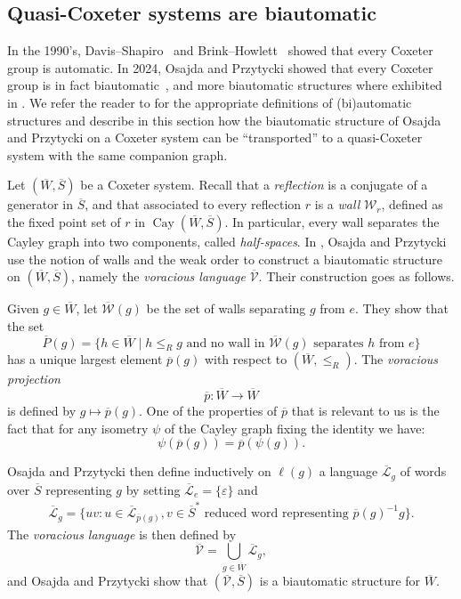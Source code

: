 \documentclass[A4paper, oneside]{amsart}
\newcommand{\id}{\textit{e}}
\newcommand{\Cay}{\operatorname{Cay}}
\newcommand{\W}{\mathcal{W}}
\newcommand{\V}{\mathcal{V}}
\theoremstyle{definition}
\begin{document}
\subsection{Quasi-Coxeter systems are biautomatic} \label{ss:Automatic} In the 1990's,  Davis--Shapiro~\cite{DS-au} and Brink--Howlett~\cite{BH-par} showed that every Coxeter group is automatic. In 2024, Osajda and Przytycki showed that every Coxeter group is in fact biautomatic~\cite{OP22}, and more biautomatic structures where exhibited in \cite{Sa25}. We refer the reader to \cite{Sa25} for the appropriate definitions of (bi)automatic structures and describe in this section how the biautomatic structure of Osajda and Przytycki on a Coxeter system can be ``transported'' to a quasi-Coxeter system with the same companion graph.
 
 \smallskip
 Let $(\overline{W}, \overline{S})$ be a Coxeter system. Recall that a \emph{reflection} is a conjugate of a generator in $\overline{S}$, and that associated to every reflection $r$ is a \emph{wall} $\W_r$, defined as the fixed point set of $r$ in $\Cay(\overline{W}, \overline{S})$. In particular, every wall separates the Cayley graph into two components, called \emph{half-spaces}. In \cite{OP22}, Osajda and Przytycki use the notion of walls and the weak order to construct a biautomatic structure on $(\overline{W}, \overline{S})$, namely the \emph{voracious language} $\overline{\V}$. Their construction goes as follows.
 
 Given $g \in \overline{W}$, let $\overline{\W}(g)$ be the set of walls separating $g$ from $\id$. They show that the set
 \[\overline{P}(g) = \{h \in \overline{W} \mid h \leq_R g \text{ and no wall in } \overline{\W}(g) \text{ separates } h \text{ from } \id\}\]
 has a unique largest element $\overline{p}(g)$ with respect to $(\overline{W},\leq_R)$. The \emph{voracious projection} 
 $$
 \overline{p}:\overline{W}\to \overline{W}
 $$
 is defined by  $g\mapsto \overline{p}(g)$. One of the properties of $\overline{p}$ that is relevant to us is the fact that for any isometry $\psi$ of the Cayley graph fixing the identity we have:
 $$
 \psi(\overline{p}(g)) = \overline{p}(\psi(g)).
 $$ 
 
 Osajda and Przytycki then define inductively on $\ell(g)$ a language $\overline{\mathcal{L}}_g$ of words over $\overline{S}$ representing $g$ by setting $\overline{\mathcal{L}}_{\id} = \{\varepsilon\}$ and
 \begin{align*}
 	\overline{\mathcal{L}}_g = \{uv : u \in \overline{\mathcal{L}}_{\overline{p}(g)}, v \in \overline{S}^* \text{ reduced word representing } \overline{p}(g)^{-1}g\}.
 \end{align*} 
 The \emph{voracious language} is then defined by
 \[\overline{\V} = \bigcup_{g \in \overline{W}} \overline{\mathcal{L}}_g,\]
 and Osajda and Przytycki show that $(\overline{\V} , \overline{S})$ is a biautomatic structure for $\overline{W}$.
 
\end{document}
